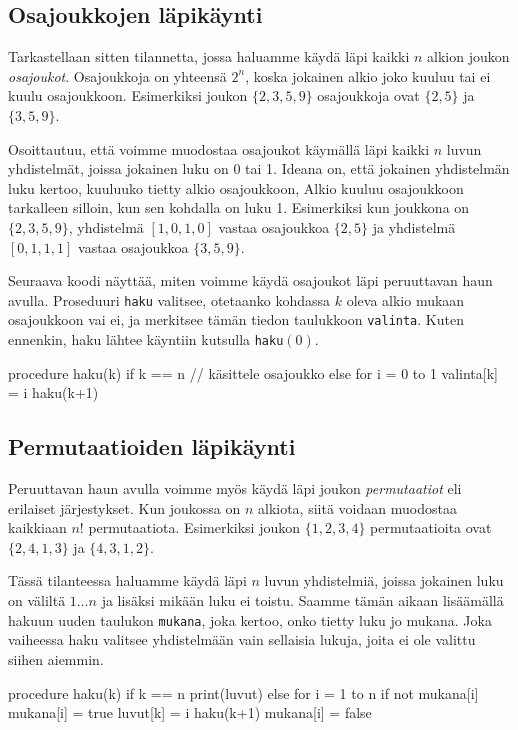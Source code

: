 \subsection{Osajoukkojen läpikäynti}

Tarkastellaan sitten tilannetta,
jossa haluamme käydä läpi kaikki $n$ alkion
joukon \emph{osajoukot}.
Osajoukkoja on yhteensä $2^n$,
koska jokainen alkio joko kuuluu tai ei kuulu osajoukkoon.
Esimerkiksi joukon $\{2,3,5,9\}$ osajoukkoja ovat
$\{2,5\}$ ja $\{3,5,9\}$.

Osoittautuu, että voimme muodostaa osajoukot
käymällä läpi kaikki $n$ luvun yhdistelmät,
joissa jokainen luku on 0 tai 1.
Ideana on, että jokainen yhdistelmän luku kertoo,
kuuluuko tietty alkio osajoukkoon,
Alkio kuuluu osajoukkoon tarkalleen silloin,
kun sen kohdalla on luku 1.
Esimerkiksi kun joukkona on $\{2,3,5,9\}$,
yhdistelmä $[1,0,1,0]$ vastaa
osajoukkoa $\{2,5\}$ ja
yhdistelmä $[0,1,1,1]$ vastaa osajoukkoa $\{3,5,9\}$.

Seuraava koodi näyttää, miten voimme käydä osajoukot
läpi peruuttavan haun avulla.
Proseduuri \texttt{haku} valitsee,
otetaanko kohdassa $k$ oleva alkio mukaan osajoukkoon vai ei,
ja merkitsee tämän tiedon taulukkoon \texttt{valinta}.
Kuten ennenkin, haku lähtee käyntiin kutsulla \texttt{haku}$(0)$.

\begin{code}
procedure haku(k)
    if k == n
        // käsittele osajoukko
    else
        for i = 0 to 1
            valinta[k] = i
            haku(k+1)
\end{code}

\subsection{Permutaatioiden läpikäynti}

Peruuttavan haun avulla voimme myös käydä läpi joukon
\emph{permutaatiot} eli erilaiset järjestykset.
Kun joukossa on $n$ alkiota, siitä voidaan muodostaa
kaikkiaan $n!$ permutaatiota.
Esimerkiksi joukon $\{1,2,3,4\}$ permutaatioita ovat
$\{2,4,1,3\}$ ja $\{4,3,1,2\}$.

Tässä tilanteessa haluamme käydä läpi $n$ luvun yhdistelmiä,
joissa jokainen luku on väliltä $1 \dots n$
ja lisäksi mikään luku ei toistu.
Saamme tämän aikaan lisäämällä hakuun uuden taulukon
\texttt{mukana}, joka kertoo, onko tietty luku jo mukana.
Joka vaiheessa haku valitsee yhdistelmään vain sellaisia lukuja,
joita ei ole valittu siihen aiemmin.

\begin{code}
procedure haku(k)
    if k == n
        print(luvut)
    else
        for i = 1 to n
            if not mukana[i]
                mukana[i] = true
                luvut[k] = i
                haku(k+1)
                mukana[i] = false
\end{code}

